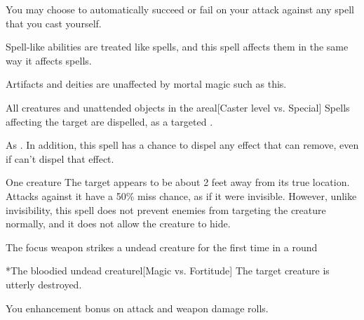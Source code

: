 You may choose to automatically succeed or fail on your attack against any spell that you cast yourself.

Spell-like abilities are treated like spells, and this spell affects them in the same way it affects spells.

Artifacts and deities are unaffected by mortal magic such as this.

\begin{spelltargets}{All creatures and unattended objects in the area}l[Caster level vs. Special]
    \spelleffect Spells affecting the target are dispelled, as a targeted .
\end{spelltargets}
\spellnotes As . In addition, this spell has a chance to dispel any effect that  can remove, even if  can't dispel that effect.

\spellrng{\rngclose}
\spelldur{\durshort \dismissable}
\begin{spelltarget}{One creature}
    \spelleffect The target appears to be about 2 feet away from its true location. Attacks against it have a 50\% miss chance, as if it were invisible. However, unlike invisibility, this spell does not prevent enemies from targeting the creature normally, and it does not allow the creature to hide.
\end{spelltarget}

\spellrng{\rngclose}
\spelldur{\durshort}
\begin{spelltrigger}{The focus weapon strikes a \bloodied undead creature for the first time in a round}
    \begin{spelltarget}*{The bloodied undead creature}l[Magic vs. Fortitude]
        \spellsuccess The target creature is utterly destroyed.
    \end{spelltarget}
\end{spelltrigger}

\spelldur{\durshort}
\begin{spelltarget}{You}
    \spelleffect {} enhancement bonus on attack and weapon damage rolls. \spellbonusscalingdescription
\end{spelltarget}

